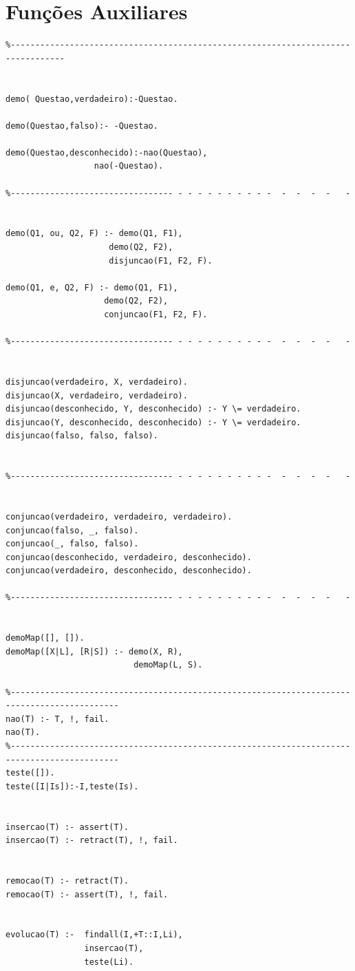 \documentclass[25pt]{article}
\begin{document}
\section{Funções Auxiliares}
\begin{lstlisting}
%---------------------------------------------------------------------------------


demo( Questao,verdadeiro):-Questao.

demo(Questao,falso):- -Questao.

demo(Questao,desconhecido):-nao(Questao),
                  nao(-Questao).

%--------------------------------- - - - - - - - - - -  -  -  -  -   -


demo(Q1, ou, Q2, F) :- demo(Q1, F1),
                     demo(Q2, F2),
                     disjuncao(F1, F2, F).

demo(Q1, e, Q2, F) :- demo(Q1, F1),
                    demo(Q2, F2),
                    conjuncao(F1, F2, F).

%--------------------------------- - - - - - - - - - -  -  -  -  -   -


disjuncao(verdadeiro, X, verdadeiro).
disjuncao(X, verdadeiro, verdadeiro).
disjuncao(desconhecido, Y, desconhecido) :- Y \= verdadeiro.
disjuncao(Y, desconhecido, desconhecido) :- Y \= verdadeiro.
disjuncao(falso, falso, falso).


%--------------------------------- - - - - - - - - - -  -  -  -  -   -


conjuncao(verdadeiro, verdadeiro, verdadeiro).
conjuncao(falso, _, falso).
conjuncao(_, falso, falso).
conjuncao(desconhecido, verdadeiro, desconhecido).
conjuncao(verdadeiro, desconhecido, desconhecido).

%--------------------------------- - - - - - - - - - -  -  -  -  -   -


demoMap([], []).
demoMap([X|L], [R|S]) :- demo(X, R),
                          demoMap(L, S).

%--------------------------------------------------------------------------------------------
nao(T) :- T, !, fail.
nao(T).
%--------------------------------------------------------------------------------------------
teste([]).
teste([I|Is]):-I,teste(Is).


insercao(T) :- assert(T).
insercao(T) :- retract(T), !, fail.


remocao(T) :- retract(T).
remocao(T) :- assert(T), !, fail.


evolucao(T) :-  findall(I,+T::I,Li),
                insercao(T),
                teste(Li).


\end{lstlisting}
\end{document}
